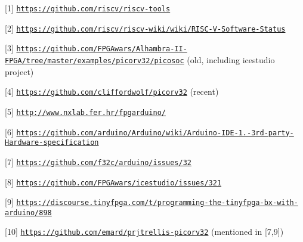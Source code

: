 \begin{DoxyItemize}
\item \mbox{[}1\mbox{]} \href{https://github.com/riscv/riscv-tools}{\tt https\-://github.\-com/riscv/riscv-\/tools}
\item \mbox{[}2\mbox{]} \href{https://github.com/riscv/riscv-wiki/wiki/RISC-V-Software-Status}{\tt https\-://github.\-com/riscv/riscv-\/wiki/wiki/\-R\-I\-S\-C-\/\-V-\/\-Software-\/\-Status}
\item \mbox{[}3\mbox{]} \href{https://github.com/FPGAwars/Alhambra-II-FPGA/tree/master/examples/picorv32/picosoc}{\tt https\-://github.\-com/\-F\-P\-G\-Awars/\-Alhambra-\/\-I\-I-\/\-F\-P\-G\-A/tree/master/examples/picorv32/picosoc} (old, including icestudio project)
\item \mbox{[}4\mbox{]} \href{https://github.com/cliffordwolf/picorv32}{\tt https\-://github.\-com/cliffordwolf/picorv32} (recent)
\item \mbox{[}5\mbox{]} \href{http://www.nxlab.fer.hr/fpgarduino/}{\tt http\-://www.\-nxlab.\-fer.\-hr/fpgarduino/}
\item \mbox{[}6\mbox{]} \href{https://github.com/arduino/Arduino/wiki/Arduino-IDE-1.5-3rd-party-Hardware-specification}{\tt https\-://github.\-com/arduino/\-Arduino/wiki/\-Arduino-\/\-I\-D\-E-\/1.-\/3rd-\/party-\/\-Hardware-\/specification}
\item \mbox{[}7\mbox{]} \href{https://github.com/f32c/arduino/issues/32}{\tt https\-://github.\-com/f32c/arduino/issues/32}
\item \mbox{[}8\mbox{]} \href{https://github.com/FPGAwars/icestudio/issues/321}{\tt https\-://github.\-com/\-F\-P\-G\-Awars/icestudio/issues/321}
\item \mbox{[}9\mbox{]} \href{https://discourse.tinyfpga.com/t/programming-the-tinyfpga-bx-with-arduino/898}{\tt https\-://discourse.\-tinyfpga.\-com/t/programming-\/the-\/tinyfpga-\/bx-\/with-\/arduino/898}
\item \mbox{[}10\mbox{]} \href{https://github.com/emard/prjtrellis-picorv32}{\tt https\-://github.\-com/emard/prjtrellis-\/picorv32} (mentioned in \mbox{[}7,9\mbox{]}) 
\end{DoxyItemize}